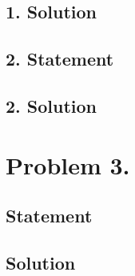 \subsection{1. Solution}
\subsection{2. Statement}
\subsection{2. Solution}

\section{Problem 3.}
\subsection{Statement}
\subsection{Solution}

\EndNoBibArticle
